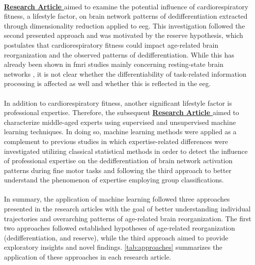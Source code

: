 \\
\textbf{\hyperref[pub:paperIII]{Research Article }} aimed to examine the potential influence of cardiorespiratory fitness, a lifestyle factor, on brain network patterns of dedifferentiation extracted through dimensionality reduction applied to \gls{eeg}. This investigation followed the second presented approach and was motivated by the reserve hypothesis, which postulates that cardiorespiratory fitness could impact age-related brain reorganization and the observed patterns of dedifferentiation. While this has already been shown in \gls{fmri} studies mainly concerning resting-state brain networks \cite{Stillman2019}, it is not clear whether the differentiability of task-related information processing is affected as well and whether this is reflected in the \gls{eeg}.\\
\\
In addition to cardiorespiratory fitness, another significant lifestyle factor is professional expertise. Therefore, the subsequent \textbf{\hyperref[pub:paperIV]{Research Article }} aimed to characterize middle-aged experts using supervised and unsupervised machine learning techniques. In doing so, machine learning methods were applied as a complement to previous studies in which expertise-related differences were investigated utilizing classical statistical methods \cite{Vieluf2018, Goelz2018} in order to detect the influence of professional expertise on the dedifferentiation of brain network activation patterns during fine motor tasks and following the third approach to better understand the phenomenon of expertise employing group classifications.\\
\\
In summary, the application of machine learning followed three approaches presented in the research articles with the goal of better understanding individual trajectories and overarching patterns of age-related brain reorganization. The first two approaches followed established hypotheses of age-related reorganization (dedifferentiation, and reserve), while the third approach aimed to provide exploratory insights and novel findings. \autoref{tab:approaches} summarizes the application of these approaches in each research article.

